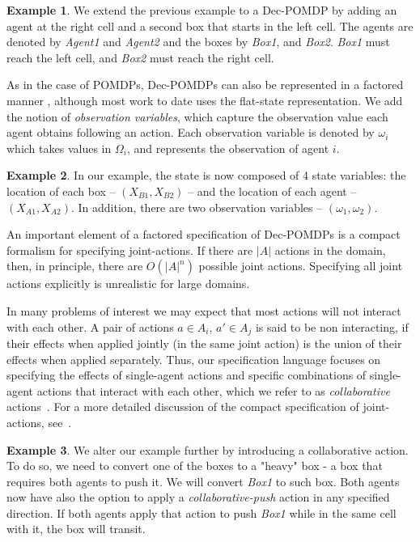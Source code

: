 \documentclass[letterpaper]{article} %
\theoremstyle{definition}
\newtheorem{example}{Example}
\begin{document}
\begin{example}
We extend the previous example 
to a Dec-POMDP by adding an agent at the right cell and a second box that starts in the left cell. The agents are denoted by \emph{Agent1} and \emph{Agent2} and the boxes by \emph{Box1}, and \emph{Box2}. \emph{Box1} must reach the left cell, and \emph{Box2} must reach the right cell.
\end{example}

As in the case of POMDPs, Dec-POMDPs can also be represented in a factored manner \cite{FDECPOMDP}, although most work to date uses the flat-state representation.
We add the notion of \emph{observation variables}, which capture the observation value each agent obtains following an action. Each observation variable is denoted by $\omega_i$ which takes values in $\Omega_i$, and represents the observation of agent $i$.

\begin{example}
In our example, the state is now composed of 4 state variables: the location of each box -- $(X_{B1}, X_{B2})$ -- and the location of each agent -- $(X_{A1}, X_{A2})$. In addition, there are two observation variables -- $(\omega_1, \omega_2)$.
\end{example}

An important element of a factored specification of Dec-POMDPs is a compact formalism for specifying joint-actions. If there are $|A|$ actions in the domain, then, in principle, there are $O(|A|^n)$ possible joint actions. Specifying all joint actions explicitly is unrealistic for large domains. 

In many problems of interest we may expect
that most actions will not interact with each other. A pair of actions $a\in A_i$, $a' \in A_j$ is said to be non interacting, if their effects when applied jointly (in the same joint action) is the union of their effects when applied separately.
Thus, our specification language focuses on specifying
the effects of single-agent actions and specific
combinations of single-agent actions that interact with each other, which we refer to as {\em collaborative} actions~\cite{IMAP}.
For a more detailed discussion of the compact specification of joint-actions, see~\cite{QDECPOMDPPLAN2}. 

\begin{example}
We alter our example further by introducing a collaborative action. To do so, we need to convert one of the boxes to a "heavy" box - a box that requires both agents to push it. We will convert \emph{Box1} to such box. Both agents now have also the option to apply a \emph{collaborative-push} action in any specified direction. If both agents apply that action to push \emph{Box1} while in the same cell with it, the box will transit.
\end{example}
\end{document}
